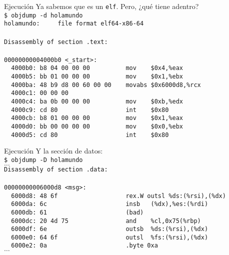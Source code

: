 \documentclass[aspectratio=169]{beamer}
\begin{document}
\begin{frame}[fragile,t]{Ejecución}
    \small
    \textcolor{verdeuca}{Ya sabemos que es un \texttt{elf}. Pero, ¿qué tiene adentro?}\\
    \pause
    \vspace{0.2cm}
    \verb|$ objdump -d holamundo|\\
    \vspace{0.2cm}
    \pause
    \verb|holamundo:     file format elf64-x86-64|\\
    \verb||\\
    \verb|Disassembly of section .text:|\\
    \verb||\\
    \verb|00000000004000b0 <_start>:|\\
    \verb|  4000b0:	b8 04 00 00 00       	mov    $0x4,%eax|\\
    \verb|  4000b5:	bb 01 00 00 00       	mov    $0x1,%ebx|\\
    \verb|  4000ba:	48 b9 d8 00 60 00 00 	movabs $0x6000d8,%rcx|\\
    \verb|  4000c1:	00 00 00 |\\
    \verb|  4000c4:	ba 0b 00 00 00       	mov    $0xb,%edx|\\
    \verb|  4000c9:	cd 80                	int    $0x80|\\
    \verb|  4000cb:	b8 01 00 00 00       	mov    $0x1,%eax|\\
    \verb|  4000d0:	bb 00 00 00 00       	mov    $0x0,%ebx|\\
    \verb|  4000d5:	cd 80                	int    $0x80|\\
\end{frame}

\begin{frame}[fragile,t]{Ejecución}
    \small
    \textcolor{verdeuca}{Y la sección de datos:}\\
    \pause
    \vspace{0.2cm}
    \verb|$ objdump -D holamundo|\\
    \vspace{0.2cm}
    \pause
    $\dots$\\
    \vspace{0.2cm}
    \verb|Disassembly of section .data:|\\
    \verb||\\
    \verb|00000000006000d8 <msg>:|\\
    \verb|  6000d8:	48 6f                	rex.W outsl %ds:(%rsi),(%dx)|\\
    \verb|  6000da:	6c                   	insb   (%dx),%es:(%rdi)|\\
    \verb|  6000db:	61                   	(bad)  |\\
    \verb|  6000dc:	20 4d 75             	and    %cl,0x75(%rbp)|\\
    \verb|  6000df:	6e                   	outsb  %ds:(%rsi),(%dx)|\\
    \verb|  6000e0:	64 6f                	outsl  %fs:(%rsi),(%dx)|\\
    \verb|  6000e2:	0a                   	.byte 0xa|\\
    \vspace{0.2cm}
    $\dots$
\end{frame}
\end{document}
